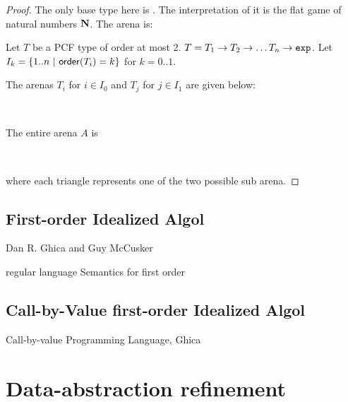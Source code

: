 \begin{proof}
The only base type here is \typexp. The interpretation of it is the
flat game of natural numbers $\mathbf{N}$. The arena is:
\begin{center}
    {   \TR{\ldots}
    }
\end{center}

Let $T$ be a PCF type of order at most 2. $T = T_1 \rightarrow T_2
\rightarrow \ldots T_n \rightarrow \texttt{exp}$. Let $I_k = \{ 1.. n\ |\
{\sf order}(T_i) = k \}$ for $k = 0..1$.

The arenas $T_i$ for $i \in I_0$ and $T_j$ for $j \in I_1$ are given
below:
\begin{center}
\
    {   \TR{\ldots} }
\hspace{2cm}
    {
        {   \TR{\ldots} }
      \TR{$1'_j$}  \TR{\ldots}
    }
\end{center}

The entire arena $A$ is
\newcommand{\SubTree}[2][]{\Tr[ref=t]{\pstribox[#1]{#2}}}
\begin{center}
\
    {
\SubTree{$T_1$} \SubTree[linestyle=dashed]{$T_i$} \SubTree{$T_n$}
    \TR{1} \TR{2} \TR{\ldots} }
\end{center}

where each triangle represents one of the two possible sub arena.



\end{proof}


\subsection{First-order Idealized Algol}

Dan R. Ghica and Guy McCusker

 regular language Semantics for first order

\subsection{Call-by-Value first-order Idealized Algol}

Call-by-value Programming Language, Ghica


\section{Data-abstraction refinement}


